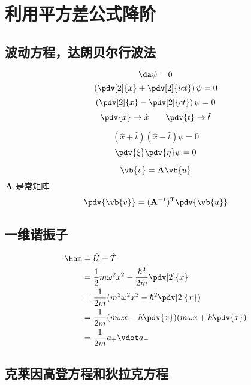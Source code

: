 
\section{利用平方差公式降阶}%

\subsection{波动方程，达朗贝尔行波法}%

\begin{equation*}
	\da \psi = 0
\end{equation*}
\begin{equation*}
	\left(	\pdv[2]{x} + \pdv[2]{ict} \right)
	\psi = 0
\end{equation*}
\begin{equation*}
	\left(	\pdv[2]{x} - \pdv[2]{ct} \right)
	\psi = 0
\end{equation*}
\begin{equation*}
\pdv{x} \to \hat{x}
\qquad
\pdv{t} \to \hat{t}
\end{equation*}

\begin{equation*}
	\left(\hat{x}+\hat{t}\right) 
	\left(\hat{x}-\hat{t}\right) 
	\psi = 0
\end{equation*}
\begin{equation*}
	\pdv{\xi} \pdv{\eta} \psi = 0
\end{equation*}


\begin{equation*}
	\vb{v} = \matr{A} \vb{u}
\end{equation*}
\(\mathbf{A}\) 是常矩阵
\begin{equation*}
	\pdv{\vb{v}} = (\matr{A}^{-1})\tp \pdv{\vb{u}}
\end{equation*}

\subsection{一维谐振子}%
\begin{equation*}
	\begin{aligned}
		\Ham &=  \hat{U} + \hat{T} \\
				 &= \frac{1}{2} m \omega^2 x^2 - \frac{\hbar^2}{2m} \pdv[2]{x} \\
				 &= \frac{1}{2m} ( m^2 \omega^2 x^2  - \hbar^2\pdv[2]{x}) \\
				 &= \frac{1}{2m} 
				 ( m \omega x  - \hbar\pdv{x})
				 ( m \omega x  + \hbar\pdv{x}) \\
				 &= \frac{1}{2m} 
				 a_+ \vdot a_-
	\end{aligned}
\end{equation*}
\subsection{克莱因高登方程和狄拉克方程}%



